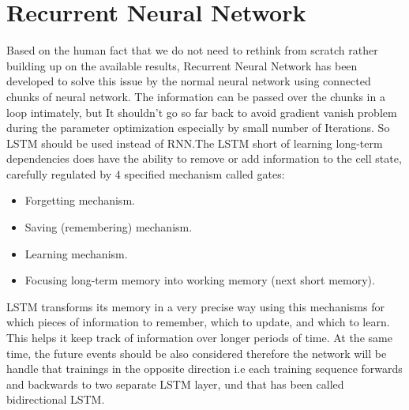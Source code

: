 \section{Recurrent Neural Network}
Based on the human fact that we do not need to rethink from scratch rather building up on the available results, Recurrent Neural Network has been developed to solve this issue by the normal neural network using connected chunks of neural network. The information can be passed over the chunks in a loop intimately, but It shouldn’t go so far back to avoid gradient vanish problem during the parameter optimization especially by small number of Iterations. So LSTM should be used instead of RNN.The LSTM short of learning long-term dependencies does have the ability to remove or add information to the cell state, carefully regulated by 4 specified mechanism called gates:
\begin{itemize}
\item Forgetting mechanism.
\item Saving (remembering) mechanism.
\item Learning mechanism.
\item Focusing long-term memory into working memory (next short memory).
\end{itemize}
LSTM transforms its memory in a very precise way using this mechanisms for which pieces of information to remember, which to update, and which to learn. This helps it keep track of information over longer periods of time. At the same time, the future events should be also considered therefore the network will be handle that trainings in the opposite direction i.e each training sequence forwards and backwards to two separate LSTM layer, und that has been called bidirectional LSTM. 
 